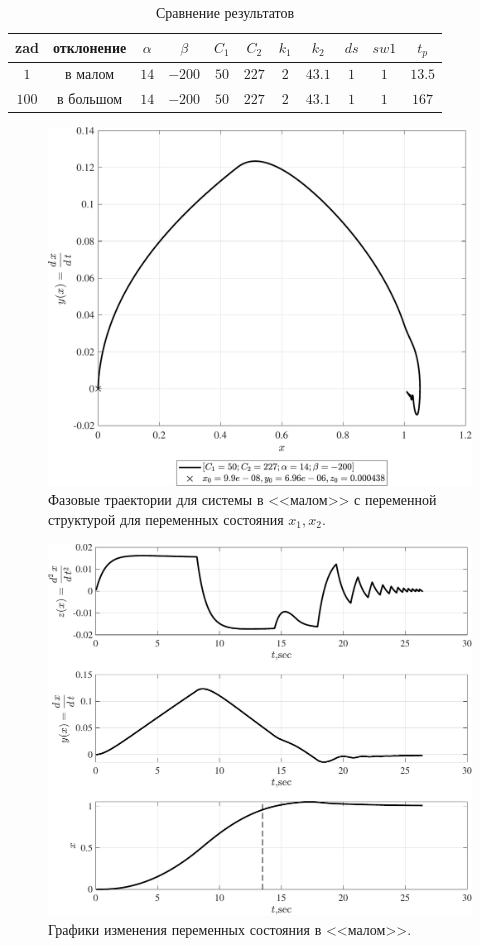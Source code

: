 \begin{table}[!h] \centering
    \caption{Сравнение результатов} \label{tab:tab_settlinhtime_VSS_final}
    \begin{tabular}{|c|c|c|c|c|c|c|c|c|c|c|}
        \hline
        zad & отклонение & $\alpha$ & $\beta$ & $C_1$ & $C_2$ & $k_1$ & $k_2$ & $ds$ & $sw1$ & $t_p$ \\ \hline
        $1$ &в малом& $14$ & $-200$ & $50$ & $227$ & $2$ & $43.1$ & $1$ & $1$ & $13.5$ \\ \hline
        $100$ &в большом& $14$ & $-200$ & $50$ & $227$ & $2$ & $43.1$ & $1$ & $1$ & $167$ \\ \hline
    \end{tabular}
\end{table}
\begin{figure}[!h]\centering
\includegraphics[width=0.7\linewidth]{images/final_VSS_ft_VSS_final_2_mal}
\caption{ Фазовые траектории для системы в <<малом>> с переменной структурой для переменных состояния $x_1,x_2$.}\label{fig:final_VSS_ft_VSS_final_2_mal}
\end{figure}
\begin{figure}[!h]\centering
\includegraphics[width=1.0\linewidth]{images/final_VSS_sv_VSS_final_mal}
\caption{ Графики изменения переменных состояния в <<малом>>.}\label{fig:final_VSS_sv_VSS_final_mal}
\end{figure}
